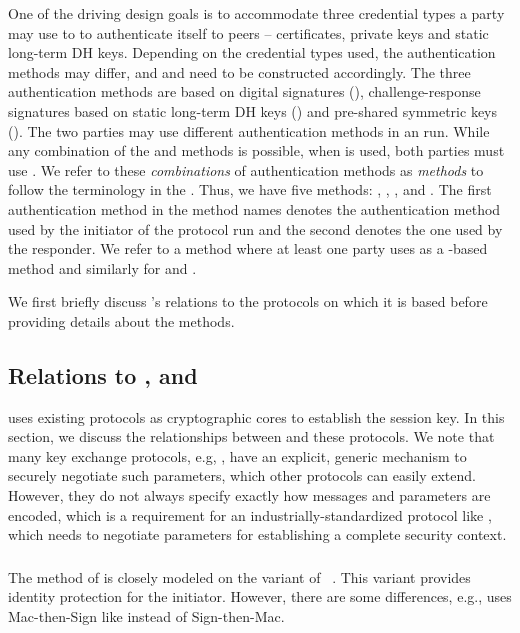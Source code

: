 One of the driving design goals is to accommodate three credential types
a party may use to to authenticate itself to peers -- certificates, private keys
and static long-term DH keys.
%
Depending on the credential types used, the authentication methods may differ,
and \mAuthi{} and \mAuthr{} need to be constructed accordingly.
%
The three authentication methods are based on digital signatures (\mSig),
challenge-response signatures based on static long-term DH keys (\mStat) and
pre-shared symmetric keys (\mPsk).
%
The two parties may use different authentication methods in an \mEdhoc{} run.
%
While any combination of the \mSig{} and \mStat{} methods is possible,
when \mPsk{} is used, both parties must use \mPsk{}.
%
We refer to these \emph{combinations} of authentication methods as
\emph{methods} to follow the terminology in the \mSpec{}.
%
Thus, we have five methods: \mSigSig, \mSigStat, \mStatStat, \mStatSig{} and
\mPskPsk.
%
The first authentication method in the method names denotes the authentication
method used by the initiator of the protocol run and the second denotes the
one used by the responder.
%
We refer to a method where at least one party uses \mSig{} as a \mSig-based
method and similarly for \mStat{} and \mPsk.
%

We first briefly discuss \mEdhoc's relations to the protocols on which it is
based before providing details about the methods.
%

\spacehack
\subsection{Relations to \mSigma, \mOptls{} and \mNoise{}}
\label{sec:relationsToOtherProtocols}
\fillhack
\mEdhoc{} uses existing protocols as cryptographic cores to
establish the session key. In this section, we discuss the relationships between
\mEdhoc{} and these protocols.
%
We note that many key exchange protocols, e.g, \mSigma{}, have an explicit,
generic mechanism to securely negotiate such parameters, which other protocols
can easily extend.
%
However, they do not always specify exactly how messages and parameters are
encoded, which is a requirement for an industrially-standardized protocol
like \mEdhoc{}, which needs to negotiate parameters for establishing a
complete \mOscore{} security context.
%

\spacehack
\subsubsection{\mSigma{}}
\label{sec:sigma}
The \mSigSig{} method of \mEdhoc{} is closely modeled on the \mSigmaI{} variant
of \mSigma{}~\cite{sigma}.
%
This variant provides identity protection for the initiator.
%
However, there are some differences, e.g., \mSigSig{} uses Mac-then-Sign like
\mTls{} instead of Sign-then-Mac. 
%

